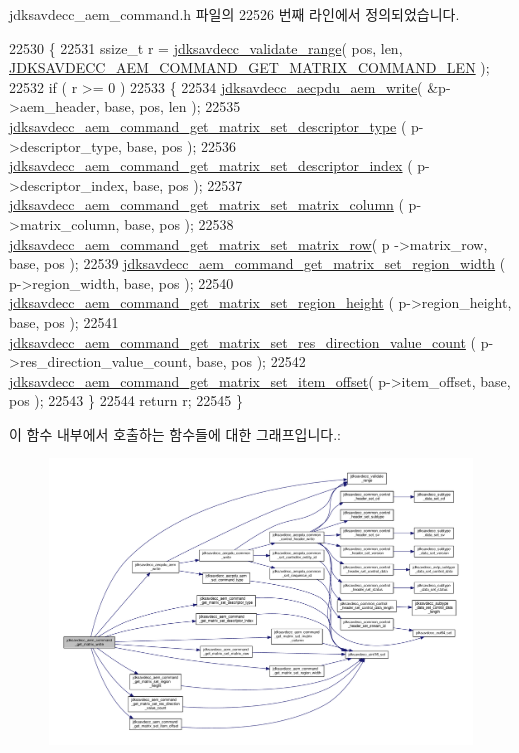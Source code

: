 jdksavdecc\+\_\+aem\+\_\+command.\+h 파일의 22526 번째 라인에서 정의되었습니다.


\begin{DoxyCode}
22530 \{
22531     ssize\_t r = \hyperlink{group__util_ga9c02bdfe76c69163647c3196db7a73a1}{jdksavdecc\_validate\_range}( pos, len, 
      \hyperlink{group__command__get__matrix_ga25f92589e7e01153802fa959751695e7}{JDKSAVDECC\_AEM\_COMMAND\_GET\_MATRIX\_COMMAND\_LEN} );
22532     \textcolor{keywordflow}{if} ( r >= 0 )
22533     \{
22534         \hyperlink{group__aecpdu__aem_gad658e55771cce77cecf7aae91e1dcbc5}{jdksavdecc\_aecpdu\_aem\_write}( &p->aem\_header, base, pos, len );
22535         \hyperlink{group__command__get__matrix_ga3586ff90411e0e3c6e8153e59ae312c8}{jdksavdecc\_aem\_command\_get\_matrix\_set\_descriptor\_type}
      ( p->descriptor\_type, base, pos );
22536         \hyperlink{group__command__get__matrix_gaca9cc2cd99f2fc9d00772c2b67e7a411}{jdksavdecc\_aem\_command\_get\_matrix\_set\_descriptor\_index}
      ( p->descriptor\_index, base, pos );
22537         \hyperlink{group__command__get__matrix_gabc0e941d90e8369d8e174cbca31bb1d1}{jdksavdecc\_aem\_command\_get\_matrix\_set\_matrix\_column}
      ( p->matrix\_column, base, pos );
22538         \hyperlink{group__command__get__matrix_ga7e74565bd026e44fefbc295feeb2d336}{jdksavdecc\_aem\_command\_get\_matrix\_set\_matrix\_row}( p
      ->matrix\_row, base, pos );
22539         \hyperlink{group__command__get__matrix_ga5219bd4a4ba04c2c508564787d526b73}{jdksavdecc\_aem\_command\_get\_matrix\_set\_region\_width}
      ( p->region\_width, base, pos );
22540         \hyperlink{group__command__get__matrix_gaacf5a7512aee836dbc33769d97466ca2}{jdksavdecc\_aem\_command\_get\_matrix\_set\_region\_height}
      ( p->region\_height, base, pos );
22541         \hyperlink{group__command__get__matrix_ga9ef202e76bca7aa12fea00dc5b0bf777}{jdksavdecc\_aem\_command\_get\_matrix\_set\_res\_direction\_value\_count}
      ( p->res\_direction\_value\_count, base, pos );
22542         \hyperlink{group__command__get__matrix_ga171cdde833ee2d14b7fdfa1d43d40fca}{jdksavdecc\_aem\_command\_get\_matrix\_set\_item\_offset}(
       p->item\_offset, base, pos );
22543     \}
22544     \textcolor{keywordflow}{return} r;
22545 \}
\end{DoxyCode}


이 함수 내부에서 호출하는 함수들에 대한 그래프입니다.\+:
\nopagebreak
\begin{figure}[H]
\begin{center}
\leavevmode
\includegraphics[width=350pt]{group__command__get__matrix_ga1fd4f698ee7ce020a126335e252e47d3_cgraph}
\end{center}
\end{figure}


